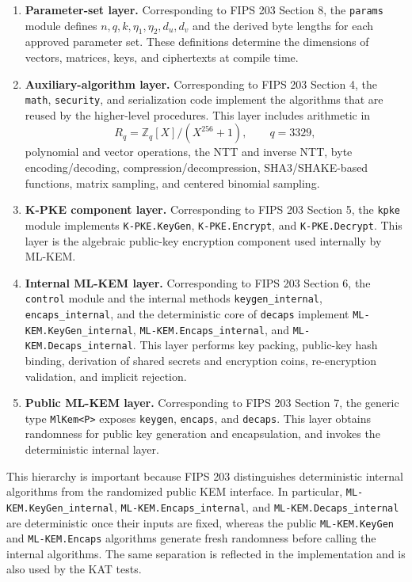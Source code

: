 \begin{enumerate}
    \item \textbf{Parameter-set layer.} Corresponding to FIPS 203 Section 8, the \texttt{params} module defines $n,q,k,\eta_1,\eta_2,d_u,d_v$ and the derived byte lengths for each approved parameter set. These definitions determine the dimensions of vectors, matrices, keys, and ciphertexts at compile time.
    \item \textbf{Auxiliary-algorithm layer.} Corresponding to FIPS 203 Section 4, the \texttt{math}, \texttt{security}, and serialization code implement the algorithms that are reused by the higher-level procedures. This layer includes arithmetic in
    $$
    R_q = \mathbb{Z}_q[X]/(X^{256}+1), \qquad q = 3329,
    $$
    polynomial and vector operations, the NTT and inverse NTT, byte encoding/decoding, compression/decompression, SHA3/SHAKE-based functions, matrix sampling, and centered binomial sampling.
    \item \textbf{K-PKE component layer.} Corresponding to FIPS 203 Section 5, the \texttt{kpke} module implements \texttt{K-PKE.KeyGen}, \texttt{K-PKE.Encrypt}, and \texttt{K-PKE.Decrypt}. This layer is the algebraic public-key encryption component used internally by ML-KEM.
    \item \textbf{Internal ML-KEM layer.} Corresponding to FIPS 203 Section 6, the \texttt{control} module and the internal methods \texttt{keygen\_internal}, \texttt{encaps\_internal}, and the deterministic core of \texttt{decaps} implement \texttt{ML-KEM.KeyGen\_internal}, \texttt{ML-KEM.Encaps\_internal}, and \texttt{ML-KEM.Decaps\_internal}. This layer performs key packing, public-key hash binding, derivation of shared secrets and encryption coins, re-encryption validation, and implicit rejection.
    \item \textbf{Public ML-KEM layer.} Corresponding to FIPS 203 Section 7, the generic type \texttt{MlKem<P>} exposes \texttt{keygen}, \texttt{encaps}, and \texttt{decaps}. This layer obtains randomness for public key generation and encapsulation, and invokes the deterministic internal layer.
\end{enumerate}

This hierarchy is important because FIPS 203 distinguishes deterministic internal algorithms from the randomized public KEM interface. In particular, \texttt{ML-KEM.KeyGen\_internal}, \texttt{ML-KEM.Encaps\_internal}, and \texttt{ML-KEM.Decaps\_internal} are deterministic once their inputs are fixed, whereas the public \texttt{ML-KEM.KeyGen} and \texttt{ML-KEM.Encaps} algorithms generate fresh randomness before calling the internal algorithms. The same separation is reflected in the implementation and is also used by the KAT tests.

